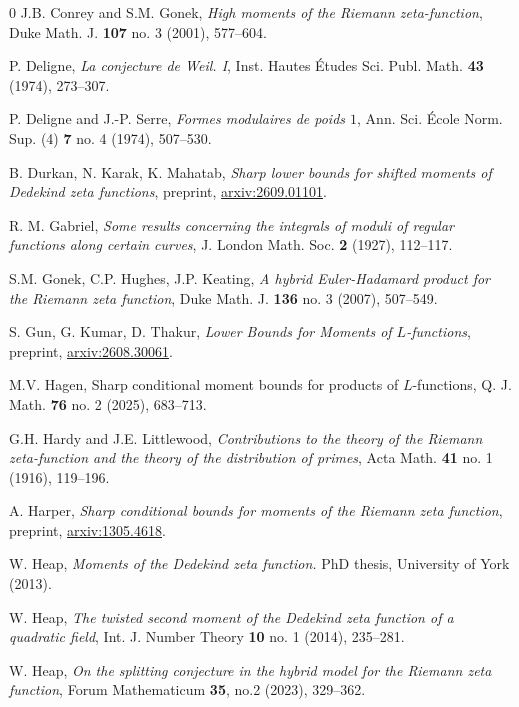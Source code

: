\documentclass[oneside, 12pt]{amsart}
\theoremstyle{definition}
\begin{document}
\begin{thebibliography}{0}
		 J.B. Conrey and S.M. Gonek, \emph{High moments of the {R}iemann zeta-function}, Duke Math. J. {\bf 107} no. 3 (2001), 577--604.
		
		 P. Deligne, \emph{La conjecture de {W}eil. {I}}, Inst. Hautes \'Etudes Sci. Publ. Math. {\bf 43} (1974), 273--307.
		
		 {P. Deligne and J.-P. Serre, \emph{Formes modulaires de poids $1$}, Ann. Sci. \'{E}cole Norm. Sup. (4) {\bf 7} no. 4 (1974), 507--530.}
		
		 B. Durkan, N. Karak, K. Mahatab, \emph{Sharp lower bounds for shifted moments of Dedekind zeta functions}, preprint, \href{https://arxiv.org/abs/2609.01101}{arxiv:2609.01101}.
		
		 {R. M. Gabriel, \emph{Some results concerning the integrals of moduli of regular functions along certain curves}, J. London Math. Soc. {\bf 2} (1927), 112--117.}
		
		 S.M. Gonek, C.P. Hughes, J.P. Keating, \emph{A hybrid {E}uler-{H}adamard product for the {R}iemann zeta function}, Duke Math. J. {\bf 136} no. 3 (2007), 507--549.
		
		 S. Gun, G. Kumar, D. Thakur, \emph{Lower {B}ounds for {M}oments of $L$-functions}, preprint, \href{https://arxiv.org/abs/2608.30061}{arxiv:2608.30061}.
		
		 M.V. Hagen, Sharp conditional moment bounds for products of
		$L$-functions, Q. J. Math. {\bf 76} no. 2 (2025), 683--713.
		
		 G.H. Hardy and J.E. Littlewood, \emph{Contributions to the theory of the {R}iemann zeta-function and the theory of the distribution of primes}, Acta Math. {\bf 41} no. 1 (1916), 119--196.
		
		 A. Harper, \emph{Sharp conditional bounds for moments of the Riemann zeta function}, preprint, \href{https://arxiv.org/abs/1305.4618}{arxiv:1305.4618}.
		
		 W. Heap, \emph{Moments of the {D}edekind zeta function.}
		PhD thesis, University of York (2013).
		
		 W. Heap, \emph{The twisted second moment of the {D}edekind zeta function of a quadratic field}, Int. J. Number Theory {\bf 10} no. 1 (2014), 235--281.
		
		 W. Heap, \emph{On the splitting conjecture in the hybrid model for the Riemann zeta function}, Forum Mathematicum {\bf 35}, no.2 (2023), 329--362.
		

\end{thebibliography}
\end{document}
